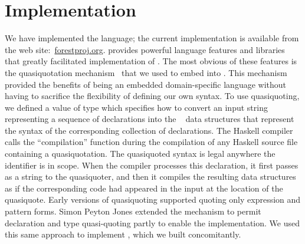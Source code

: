 \section{Implementation}
\label{sec:implementation}

We have implemented the \forest{} language; the current
implementation is available from the \forest{} web
site:~\url{forestproj.org}. 
\haskell{} provides powerful language features and libraries that
greatly facilitated implementation of \forest{}.  The most obvious
of these features is the quasiquotation mechanism~\cite{Mainland:quasi}
that we used to embed \forest{} into \haskell{}.  This mechanism
provided the benefits of being an embedded domain-specific
language without having to sacrifice the flexibility of
defining our own syntax. To use quasiquoting, we defined a \haskell{}
value  of type  which specifies how to
convert an input string representing a sequence of \forest{} declarations into the
\template{}~\cite{Sheard+:templatehaskell} 
data structures that represent the syntax of the
corresponding collection of \haskell{} declarations.
The Haskell compiler calls the  ``compilation'' function 
during the compilation of any Haskell source file containing a \forest{} quasiquotation.
The quasiquoted syntax 
is legal anywhere the identifier  is in scope.
When the \haskell{} compiler processes this declaration, it first
passes  as a string to the  quasiquoter, and
then it compiles the resulting \template{} data structures as if the
corresponding \haskell{} code had appeared in the input at the
location of the quasiquote.  Early versions of quasiquoting
supported quoting only expression and pattern forms.  Simon Peyton
Jones extended the mechanism to permit declaration and type
quasi-quoting partly to enable the \forest{} implementation.  We used
this same approach to implement \padshaskell{}, which we built
concomitantly.  

